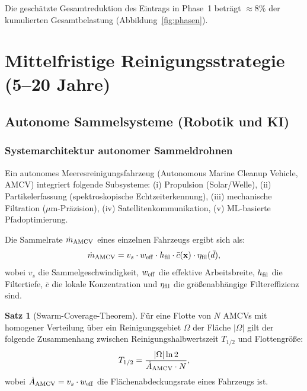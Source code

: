 ﻿\documentclass[12pt,a4paper]{article}
\theoremstyle{definition}
\newtheorem{theorem}{Satz}[section]
\theoremstyle{remark}
\begin{document}
\noindent Die gesch\"atzte Gesamtreduktion des Eintrags in Phase~1 betr\"agt
$\approx 8\%$ der kumulierten Gesamtbelastung (Abbildung~\ref{fig:phasen}).

\section{Mittelfristige Reinigungsstrategie (5--20 Jahre)}
\label{sec:mittelfristig}

\subsection{Autonome Sammelsysteme (Robotik und KI)}

\subsubsection{Systemarchitektur autonomer Sammeldrohnen}

Ein autonomes Meeresreinigungsfahrzeug (Autonomous Marine Cleanup Vehicle,
AMCV) integriert folgende Subsysteme: (i) Propulsion (Solar/Welle), (ii)
Partikelerfassung (spektroskopische Echtzeiterkennung), (iii) mechanische
Filtration ($\mu$m-Pr\"azision), (iv) Satellitenkommunikation, (v) ML-basierte
Pfadoptimierung.

Die Sammelrate $\dot{m}_{\rm AMCV}$ eines einzelnen Fahrzeugs ergibt sich als:
\begin{equation}
  \dot{m}_{\rm AMCV} = v_s \cdot w_{\rm eff} \cdot h_{\rm fil} \cdot
  \bar{c}(\mathbf{x}) \cdot \eta_{\rm fil}(\bar{d}),
  \label{eq:amcv_rate}
\end{equation}
wobei $v_s$ die Sammelgeschwindigkeit, $w_{\rm eff}$ die effektive Arbeitsbreite,
$h_{\rm fil}$ die Filtertiefe, $\bar{c}$ die lokale Konzentration und
$\eta_{\rm fil}$ die gr\"o\ss{}enabh\"angige Filtereffizienz sind.

\begin{theorem}[Swarm-Coverage-Theorem]
\label{satz:swarm}
F\"ur eine Flotte von $N$ AMCVs mit homogener Verteilung \"uber ein
Reinigungsgebiet $\Omega$ der Fl\"ache $|\Omega|$ gilt der folgende
Zusammenhang zwischen Reinigungshalbwertszeit $T_{1/2}$ und Flottengr\"o\ss{}e:
\begin{equation}
  T_{1/2} = \frac{|\Omega| \ln 2}{\dot{A}_{\rm AMCV} \cdot N},
  \label{eq:t_half}
\end{equation}
wobei $\dot{A}_{\rm AMCV} = v_s \cdot w_{\rm eff}$ die Fl\"achenabdeckungsrate
eines Fahrzeugs ist.
\end{theorem}
\end{document}
